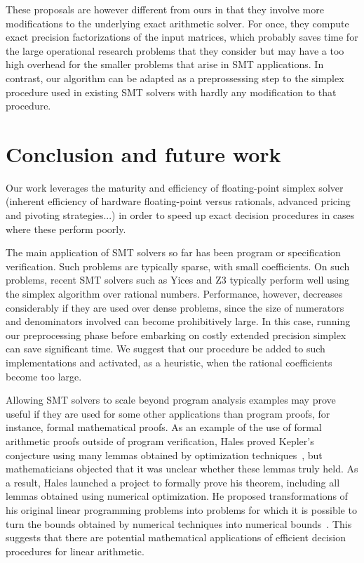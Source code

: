 These proposals are however different from ours in that they involve more modifications to the underlying exact arithmetic solver. For once, they compute exact precision factorizations of the input matrices, which probably saves time for the large operational research problems that they consider but may have a too high overhead for the smaller problems that arise in SMT applications. In contrast, our algorithm can be adapted as a preprossessing step to the simplex procedure used in existing SMT solvers with hardly any modification to that procedure.

\section{Conclusion and future work}
Our work leverages the maturity and efficiency of floating-point simplex solver (inherent efficiency of hardware floating-point versus rationals, advanced pricing and pivoting strategies...) in order to speed up exact decision procedures in cases where these perform poorly.

The main application of SMT solvers so far has been program or specification verification. Such problems are typically sparse, with small coefficients. On such problems, recent SMT solvers such as Yices and Z3 typically perform well using the simplex algorithm over rational numbers. Performance, however, decreases considerably if they are used over dense problems, since the size of numerators and denominators involved can become prohibitively large. In this case, running our preprocessing phase before embarking on costly extended precision simplex can save significant time. We suggest that our procedure be added to such implementations and activated, as a heuristic, when the rational coefficients become too large.

Allowing SMT solvers to scale beyond program analysis examples may prove useful if they are used for some other applications than program proofs, for instance, formal mathematical proofs. As an example of the use of formal arithmetic proofs outside of program verification, Hales proved Kepler's conjecture using many lemmas obtained by optimization techniques~\cite{Hales05_Kepler}, but mathematicians objected that it was unclear whether these lemmas truly held. As a result, Hales launched a project to formally prove his theorem, including all lemmas obtained using numerical optimization. He proposed transformations of his original linear programming problems into problems for which it is possible to turn the bounds obtained by numerical techniques into numerical bounds~\cite{Hales02_Kepler}. This suggests that there are potential mathematical applications of efficient decision procedures for linear arithmetic.

